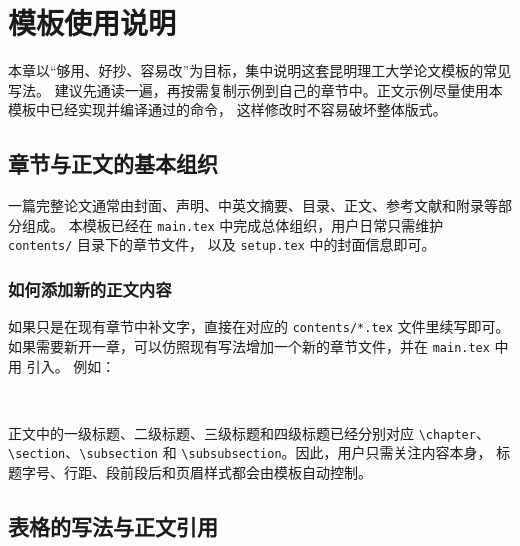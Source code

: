 \chapter{模板使用说明}

本章以“够用、好抄、容易改”为目标，集中说明这套昆明理工大学论文模板的常见写法。
建议先通读一遍，再按需复制示例到自己的章节中。正文示例尽量使用本模板中已经实现并编译通过的命令，
这样修改时不容易破坏整体版式。

\section{章节与正文的基本组织}

一篇完整论文通常由封面、声明、中英文摘要、目录、正文、参考文献和附录等部分组成。
本模板已经在 \verb|main.tex| 中完成总体组织，用户日常只需维护 \verb|contents/| 目录下的章节文件，
以及 \verb|setup.tex| 中的封面信息即可。

\subsection{如何添加新的正文内容}

如果只是在现有章节中补文字，直接在对应的 \verb|contents/*.tex| 文件里续写即可。
如果需要新开一章，可以仿照现有写法增加一个新的章节文件，并在 \verb|main.tex| 中用 \verb|| 引入。
例如：

\begin{verbatim}


\end{verbatim}

正文中的一级标题、二级标题、三级标题和四级标题已经分别对应 \verb|\chapter|、
\verb|\section|、\verb|\subsection| 和 \verb|\subsubsection|。因此，用户只需关注内容本身，
标题字号、行距、段前段后和页眉样式都会由模板自动控制。

\section{表格的写法与正文引用}

